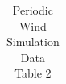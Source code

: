 \begin{table}[H]
\begin{tabular}{|c|c|c|}
 \end{tabular}%
 \caption{Periodic Wind Simulation Data Table 2} 
 \label{tab:simSin2}%
 \end{table}%















